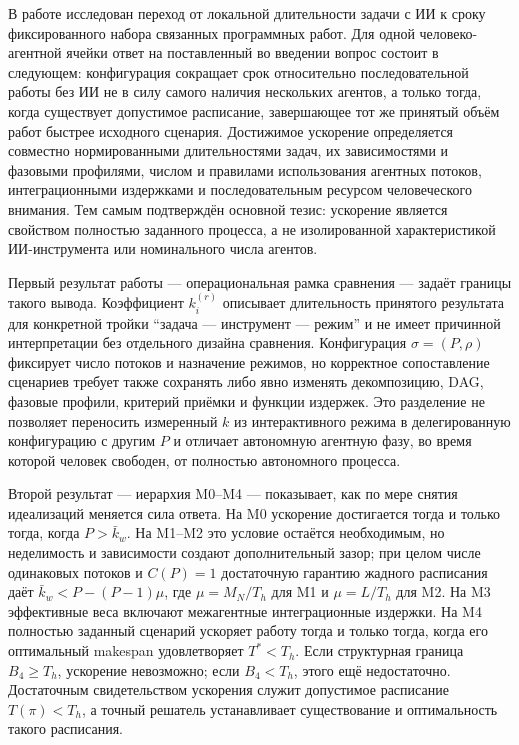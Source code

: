 В работе исследован переход от локальной длительности задачи с ИИ к сроку
фиксированного набора связанных программных работ. Для одной
человеко-агентной ячейки ответ на поставленный во введении вопрос состоит в
следующем: конфигурация сокращает срок относительно последовательной работы без
ИИ не в силу самого наличия нескольких агентов, а только тогда, когда
существует допустимое расписание, завершающее тот же принятый объём работ
быстрее исходного сценария. Достижимое ускорение определяется совместно
нормированными
длительностями задач, их зависимостями и фазовыми профилями, числом и правилами
использования агентных потоков, интеграционными издержками и последовательным
ресурсом человеческого внимания. Тем самым подтверждён основной тезис:
ускорение является свойством полностью заданного процесса, а не изолированной
характеристикой ИИ-инструмента или номинального числа агентов.

Первый результат работы --- операциональная рамка сравнения --- задаёт границы
такого вывода. Коэффициент $k_i^{(r)}$ описывает длительность принятого
результата для конкретной тройки ``задача --- инструмент --- режим'' и не имеет
причинной интерпретации без отдельного дизайна сравнения. Конфигурация
$\sigma=(P,\rho)$ фиксирует число потоков и назначение режимов, но корректное
сопоставление сценариев требует также сохранять либо явно изменять
декомпозицию, DAG, фазовые профили, критерий приёмки и функции издержек. Это
разделение не позволяет переносить измеренный $k$ из интерактивного режима в
делегированную конфигурацию с другим $P$ и отличает автономную агентную фазу,
во время которой человек свободен, от полностью автономного процесса.

Второй результат --- иерархия M0--M4 --- показывает, как по мере снятия
идеализаций меняется сила ответа. На M0 ускорение достигается тогда и только
тогда, когда $P>\bar{k}_w$. На M1--M2 это условие остаётся необходимым, но
неделимость и зависимости создают дополнительный зазор; при целом числе
одинаковых потоков и $C(P)=1$ достаточную гарантию жадного расписания даёт
$\bar{k}_w<P-(P-1)\mu$, где $\mu=M_N/T_h$ для M1 и $\mu=L/T_h$ для M2. На
M3 эффективные веса включают межагентные интеграционные издержки. На M4
полностью заданный сценарий ускоряет работу тогда и только тогда, когда его
оптимальный makespan удовлетворяет $T^*<T_h$. Если структурная граница
$B_4\ge T_h$, ускорение невозможно; если $B_4<T_h$, этого ещё недостаточно.
Достаточным свидетельством ускорения служит допустимое расписание
$T(\pi)<T_h$, а точный решатель устанавливает существование и оптимальность
такого расписания.

